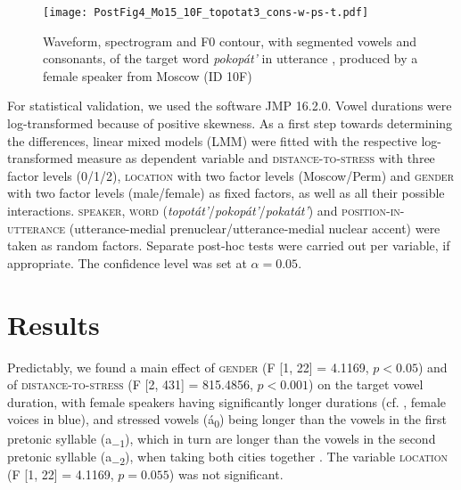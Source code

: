 \documentclass[output=paper]{langscibook}
\begin{document}
\begin{figure}
\texttt{[image: PostFig4\_Mo15\_10F\_topotat3\_cons-w-ps-t.pdf]}
\caption{\label{fig:post:4} Waveform, spectrogram and F0 contour, with segmented vowels and consonants, of the target word \textit{pokopát’} in utterance , produced by a female speaker from Moscow (ID 10F)}
\end{figure}


For statistical validation, we used the software JMP 16.2.0. Vowel durations were log-transformed because of positive skewness. As a first step towards determining the differences, linear mixed models (LMM) were fitted with the respective log-transformed measure as dependent variable and \textsc{distance-to-stress} with three factor levels (0/1/2), \textsc{location} with two factor levels (Moscow/Perm) and \textsc{gender} with two factor levels (male/female) as fixed factors, as well as all their possible interactions. \textsc{speaker}, \textsc{word} (\textit{topotát’}/\textit{pokopát’}/\textit{pokatát’}) and \textsc{position-in-utterance} (utterance-medial prenuclear\slash utterance-medial nuclear accent) were taken as random factors. Separate post-hoc tests were carried out per variable, if appropriate. The confidence level was set at $\alpha = 0.05$.


\section{Results}
\label{sec:post:3}
Predictably, we found a main effect of \textsc{gender} (F [1, 22] = 4.1169, $p < 0.05$) and of \textsc{distance-to-stress} (F [2, 431] = 815.4856, $p < 0.001$) on the target vowel duration, with female speakers having significantly longer durations (cf. , female voices in blue), and stressed vowels (á\textsubscript{0}) being longer than the vowels in the first pretonic syllable (a\textsubscript{$-1$}), which in turn are longer than the vowels in the second pretonic syllable (a\textsubscript{$-2$}), when taking both cities together \citep{postaccepted}. The variable \textsc{location} (F [1, 22] = 4.1169, $p = 0.055$) was not significant.
\end{document}
